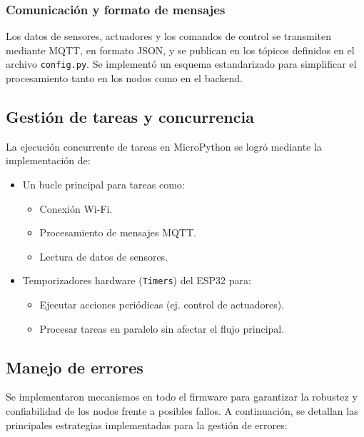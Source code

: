 \subsubsection{Comunicación y formato de mensajes}

Los datos de sensores, actuadores y los comandos de control se transmiten
mediante MQTT, en formato JSON, y se publican en los tópicos definidos en el
archivo \texttt{config.py}. Se implementó un esquema estandarizado para
simplificar el procesamiento tanto en los nodos como en el backend.


\subsection{Gestión de tareas y concurrencia}

La ejecución concurrente de tareas en MicroPython se logró mediante la
implementación de:

\begin{itemize}
    \item Un bucle principal para tareas como:
          \begin{itemize}
              \item Conexión Wi-Fi.
              \item Procesamiento de mensajes MQTT.
              \item Lectura de datos de sensores.
          \end{itemize}
    \item Temporizadores hardware (\texttt{Timers}) del ESP32 para:
          \begin{itemize}
              \item Ejecutar acciones periódicas (ej. control de actuadores).
              \item Procesar tareas en paralelo sin afectar el flujo principal.
          \end{itemize}
\end{itemize}


\subsection{Manejo de errores}

Se implementaron mecanismos en todo el firmware para garantizar la robustez y
confiabilidad de los nodos frente a posibles fallos. A continuación, se
detallan las principales estrategias implementadas para la gestión de errores:

